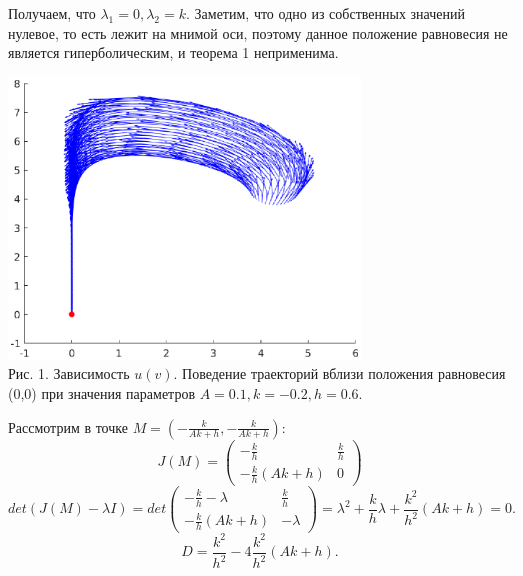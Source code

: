\documentclass[11pt]{article}
\begin{document}
{\begin{equation}
	\end{equation}
	{Получаем, что $\lambda_1 = 0, \lambda_2 = k.$ Заметим, что одно из собственных значений нулевое, то есть лежит на мнимой оси, поэтому данное положение равновесия не является гиперболическим, и теорема 1 неприменима. }
	\newline
	\newline
	\begin{center}
		\includegraphics[width=0.7\textwidth]{pic_1.eps}\\
		{Рис. 1. Зависимость $u(v).$ Поведение траекторий вблизи положения равновесия (0,0) при значения параметров $A = 0.1, k = -0.2, h = 0.6.$ }
	\end{center}
	{Рассмотрим в точке $M =(-\frac{k}{Ak + h}, -\frac{k}{Ak + h})$:}
	\begin{equation}
	J(M) = \begin{pmatrix}
	-\frac{k}{h} & \frac{k}{h} \\
	-\frac{k}{h}(Ak + h) & 0
	\end{pmatrix}
	\end{equation}
	\begin{equation}
	det(J(M) - \lambda I) = det\begin{pmatrix}
	-\frac{k}{h}-\lambda & \frac{k}{h} \\
	-\frac{k}{h}(Ak + h) & -\lambda
	\end{pmatrix} = \lambda^2 + \frac{k}{h}\lambda + \frac{k^2}{h^2}(Ak + h) = 0.
	\end{equation}
	\begin{equation}
	   D = \frac{k^2}{h^2} - 4 \frac{k^2}{h^2}(Ak + h). 
	\end{equation}
	
}
\end{document}
